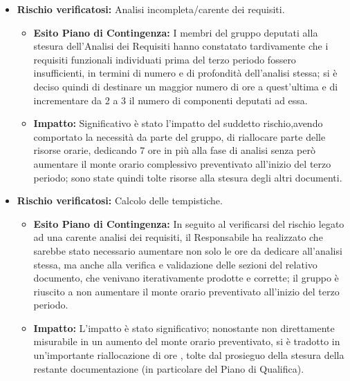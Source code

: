 \begin{itemize}
\item \textbf{Rischio verificatosi:} Analisi incompleta/carente dei requisiti.
\begin{itemize}
\item \textbf{Esito Piano di Contingenza:} I membri del gruppo deputati alla stesura dell'Analisi dei Requisiti hanno constatato tardivamente
che i requisiti funzionali individuati prima del terzo periodo fossero insufficienti, in termini di numero e di 
profondità dell'analisi stessa; si è deciso quindi di destinare un maggior numero di ore a quest'ultima e di incrementare da
 2 a 3 il numero di componenti deputati ad essa. \\
\item \textbf{Impatto:} Significativo è stato l'impatto del suddetto rischio,avendo comportato la necessità
da parte del gruppo, di riallocare parte delle risorse orarie, dedicando 7 ore in più alla fase di analisi senza però
aumentare il monte orario complessivo preventivato all'inizio del terzo periodo; sono state
quindi tolte risorse alla stesura degli altri documenti.\\
\end{itemize}

\item \textbf{Rischio verificatosi:} Calcolo delle tempistiche.\\
\begin{itemize}
\item \textbf{Esito Piano di Contingenza:} In seguito al verificarsi del rischio legato ad una carente analisi dei requisiti, il Responsabile ha realizzato
che sarebbe stato necessario aumentare non solo le ore da dedicare all'analisi stessa, ma anche alla verifica e 
validazione delle sezioni del relativo documento, che venivano iterativamente prodotte e corrette; il gruppo è riuscito  a non aumentare
il monte orario preventivato all'inizio del terzo periodo. \\
\item \textbf{Impatto:} L'impatto è stato significativo; nonostante non direttamente misurabile in un aumento del monte orario preventivato,
si è tradotto in un'importante riallocazione di ore , tolte dal prosieguo della stesura della restante documentazione (in particolare del Piano
di Qualifica).
\end{itemize}


\end{itemize}
